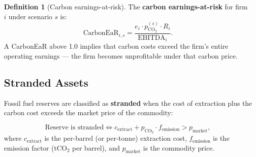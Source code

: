 \documentclass[11pt, a4paper]{article}
\theoremstyle{definition}
\newtheorem{definition}{Definition}[section]
\theoremstyle{plain}
\theoremstyle{remark}
\begin{document}
\begin{definition}[Carbon earnings-at-risk]\label{def:carbon-ear}
The \textbf{carbon earnings-at-risk} for firm $i$ under scenario $s$ is:
\begin{equation}
    \text{CarbonEaR}_{i,s} = \frac{e_i \cdot p_{\text{CO}_2}^{(s)} \cdot R_i}
    {\text{EBITDA}_i}.
\end{equation}
A CarbonEaR above 1.0 implies that carbon costs exceed the firm's entire
operating earnings --- the firm becomes unprofitable under that carbon price.
\end{definition}

\subsection{Stranded Assets}

Fossil fuel reserves are classified as \textbf{stranded} when the cost of
extraction plus the carbon cost exceeds the market price of the commodity:

\begin{equation}\label{eq:stranded}
    \text{Reserve is stranded} \iff
    c_{\text{extract}} + p_{\text{CO}_2} \cdot f_{\text{emission}} > p_{\text{market}},
\end{equation}
where $c_{\text{extract}}$ is the per-barrel (or per-tonne) extraction cost,
$f_{\text{emission}}$ is the emission factor (tCO$_2$ per barrel), and
$p_{\text{market}}$ is the commodity price.
\end{document}
